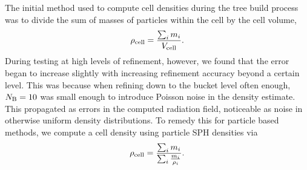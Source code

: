 \documentclass[fleq,usenatbib]{mnras}
\begin{document}
{The initial method used to compute cell densities during the tree build 
process was to divide the sum of masses of particles within the cell by the 
cell volume, 
\begin{equation}
\rho_{\rm cell} = \frac{\sum_i m_i}{V_{\rm cell}}.
\end{equation}
During testing at high levels of refinement, however, we found that the error 
began to increase slightly with increasing refinement accuracy beyond a 
certain level. This was because when refining down to the bucket level often 
enough, $N_{\rm B}=10$ was small enough to introduce Poisson noise in the 
density estimate.  This propagated as errors
in the computed radiation field, noticeable as noise in otherwise uniform 
density distributions.  To remedy this for particle based methods, we compute a 
cell density using particle SPH densities via 
\begin{equation}
\rho_{\rm cell} = \frac{\sum_i m_i}{\sum_i{\frac{m_i}{\rho_i}}}.
\end{equation}

}
\end{document}

